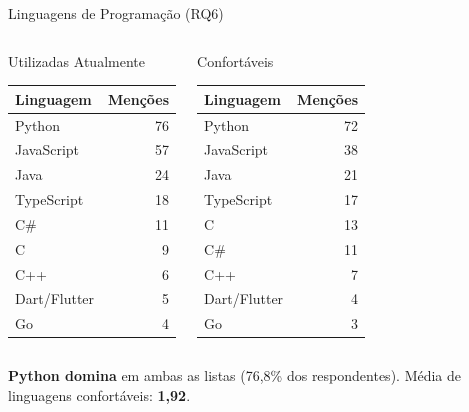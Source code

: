\documentclass[fleqn]{beamer}
\begin{document}
\begin{frame}{Linguagens de Programação (RQ6)}
\begin{columns}[T]
\begin{block}{Utilizadas Atualmente}
\scriptsize
\begin{tabular}{lr}
\toprule
\textbf{Linguagem} & \textbf{Menções} \\
\midrule
Python & 76 \\
JavaScript & 57 \\
Java & 24 \\
TypeScript & 18 \\
C\# & 11 \\
C & 9 \\
C++ & 6 \\
Dart/Flutter & 5 \\
Go & 4 \\
\bottomrule
\end{tabular}
\end{block}

\begin{block}{Confortáveis}
\scriptsize
\begin{tabular}{lr}
\toprule
\textbf{Linguagem} & \textbf{Menções} \\
\midrule
Python & 72 \\
JavaScript & 38 \\
Java & 21 \\
TypeScript & 17 \\
C & 13 \\
C\# & 11 \\
C++ & 7 \\
Dart/Flutter & 4 \\
Go & 3 \\
\bottomrule
\end{tabular}
\end{block}
\end{columns}

\vspace{0.2cm}
\textbf{Python domina} em ambas as listas (76,8\% dos respondentes). Média de linguagens confortáveis: \textbf{1,92}.
\end{frame}
\end{document}

